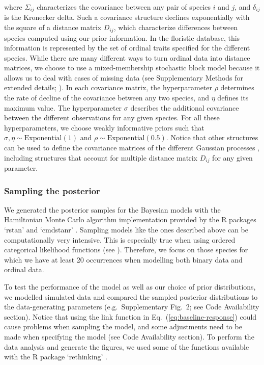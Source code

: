 \documentclass[11pt, a4paper]{article}
\begin{document}
where $\Sigma_{ij}$ characterizes the covariance between any pair of species $i$ and $j$, and $\delta_{ij}$ is the Kronecker delta. Such a covariance structure declines exponentially with the square of a distance matrix $D_{ij}$, which characterize differences between species computed using our prior information. In the floristic database, this information is represented by the set of ordinal traits specified for the different species. While there are many different ways to turn ordinal data into distance matrices, we choose to use a mixed-membership stochastic block model because it allows us to deal with cases of missing data (see Supplementary Methods for extended details; \citealt{godoy-loriteAccurateScalableSocial2016}). In each covariance matrix, the hyperparameter $\rho$ determines the rate of decline of the covariance between any two species, and $\eta$ defines its maximum value. The hyperparameter $\sigma$ describes the additional covariance between the different observations for any given species. For all these hyperparameters, we choose weakly informative priors such that $\sigma , \eta \sim \text{Exponential}\left(1\right)$ and $\rho\sim \text{Exponential}\left(0.5\right)$. Notice that other structures can be used to define the covariance matrices of the different Gaussian processes \citep{mcelreathStatisticalRethinkingBayesian2020}, including structures that account for multiple distance matrix $D_{ij}$ for any given parameter.

\subsubsection*{Sampling the posterior}
We generated the posterior samples for the Bayesian models with the Hamiltonian Monte Carlo algorithm implementation provided by the R packages `rstan' and `cmdstanr' \citep{standevelopentteamRStanInterfaceStan2021}. Sampling models like the ones described above can be computationally very intensive. This is especially true when using ordered categorical likelihood functions (see \citealt{standevelopmentteamStanModelingLanguage2021}). Therefore, we focus on those species for which we have at least 20 occurrences when modelling both binary data and ordinal data.

To test the performance of the model as well as our choice of prior distributions, we modelled simulated data and compared the sampled posterior distributions to the data-generating parameters (e.g.~Supplementary Fig.~2; see Code Availability section). Notice that using the link function in Eq.~(\ref{eq:baseline-response}) could cause problems when sampling the model, and some adjustments need to be made when specifying the model (see Code Availability section). To perform the data analysis and generate the figures, we used some of the functions available with the R package `rethinking' \citep{mcelreathStatisticalRethinkingBayesian2020}.
\end{document}
